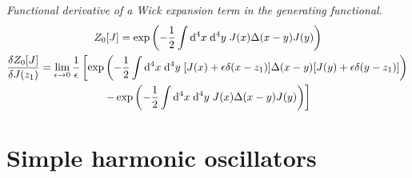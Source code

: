 \documentclass{report}
\begin{document}
\begin{subquests}
	\item \emph{Functional derivative of a Wick expansion term in the generating functional.}
	\begin{gather*}
		Z_0[J] = \exp\pqty{-\frac{1}{2}\int\dd^4{x}\;\dd^4{y}\;J(x)\Delta(x-y)J(y)} \\
		\fdv{Z_0[J]}{J(z_1)} = \lim_{\epsilon \to 0} \frac{1}{\epsilon}\left[\exp\pqty{-\frac{1}{2}\int\dd^4{x}\;\dd^4{y}\;\bqty{J(x) + \epsilon \delta(x - z_1)}\Delta(x-y)\bqty{J(y) + \epsilon \delta(y - z_1)}} \right. \\
		\left. - \exp\pqty{-\frac{1}{2}\int\dd^4{x}\;\dd^4{y}\;J(x)\Delta(x-y)J(y)}\right] \\
	\end{gather*}
\end{subquests}
	

\chapter{Simple harmonic oscillators}
\end{document}
